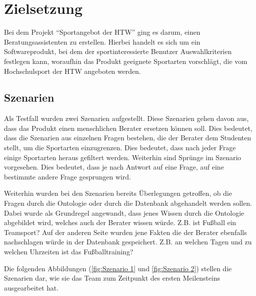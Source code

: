 \chapter{Zielsetzung}
Bei dem Projekt "`Sportangebot der HTW"' ging es darum, einen Beratungsassistenten zu erstellen. Hierbei handelt es sich um ein Softwareprodukt, bei dem der sportinteressierte Benutzer Auswahlkriterien festlegen kann, woraufhin das Produkt geeignete Sportarten vorschlägt, die vom Hochschulsport der HTW angeboten werden.

\section{Szenarien}
Als Testfall wurden zwei Szenarien aufgestellt. Diese Szenarien gehen davon aus, dass das Produkt einen menschlichen Berater ersetzen können soll. Dies bedeutet, dass die Szenarien aus einzelnen Fragen bestehen, die der Berater dem Studenten stellt, um die Sportarten einzugrenzen. Dies bedeutet, dass nach jeder Frage einige Sportarten heraus gefiltert werden. Weiterhin sind Sprünge im Szenario vorgesehen. Dies bedeutet, dass je nach Antwort auf eine Frage, auf eine bestimmte andere Frage gesprungen wird.

Weiterhin wurden bei den Szenarien bereits Überlegungen getroffen, ob die Fragen durch die Ontologie oder durch die Datenbank abgehandelt werden sollen. Dabei wurde als Grundregel angewandt, dass jenes Wissen durch die Ontologie abgebildet wird, welches auch der Berater wissen würde. Z.B. ist Fußball ein Teamsport? Auf der anderen Seite wurden jene Fakten die der Berater ebenfalls nachschlagen würde in der Datenbank gespeichert. Z.B. an welchen Tagen und zu welchen Uhrzeiten ist das Fußballtraining?

Die folgenden Abbildungen (\ref{fig:Szenario 1} und \ref{fig:Szenario 2}) stellen die Szenarien dar, wie sie das Team zum Zeitpunkt des ersten Meilensteins ausgearbeitet hat.

